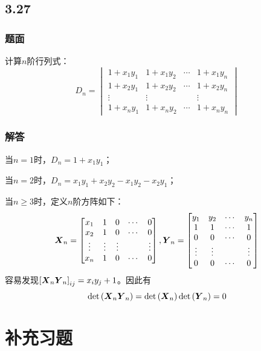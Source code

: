 \documentclass[10pt,xcolor=svgnames]{beamer} %
\begin{document}
\subsection*{3.27}
\begin{frame}
    \frametitle{题面}
    计算\(n\)阶行列式：
    \begin{equation*}
        D_n=
        \begin{vmatrix}
            1+x_{1}y_{1} & 1+x_{1}y_{2} & \cdots & 1+x_{1}y_{n} \\
            1+x_{2}y_{1} & 1+x_{2}y_{2} & \cdots & 1+x_{2}y_{n} \\
            \vdots       & \vdots       &        & \vdots       \\
            1+x_{n}y_{1} & 1+x_{n}y_{2} & \cdots & 1+x_{n}y_{n}
        \end{vmatrix}
    \end{equation*}
\end{frame}
\begin{frame}
    \frametitle{解答}
    当\(n=1\)时，\(D_n=1+x_1y_1\)；

    当\(n=2\)时，\(D_n=x_1y_1+x_2y_2-x_1y_2-x_2y_1\)；
    \pause

    当\(n\geq3\)时，定义\(n\)阶方阵如下：
    \begin{equation*}
        \boldsymbol{X}_n=
        \begin{bmatrix}
            x_{1}  & 1      & 0      & \cdots & 0      \\
            x_{2}  & 1      & 0      & \cdots & 0      \\
            \vdots & \vdots & \vdots &        & \vdots \\
            x_{n}  & 1      & 0      & \cdots & 0
        \end{bmatrix},
        \boldsymbol{Y}_n=
        \begin{bmatrix}
            y_{1}  & y_{2}  & \cdots & y_{n}  \\
            1      & 1      & \cdots & 1      \\
            0      & 0      & \cdots & 0      \\
            \vdots & \vdots &        & \vdots \\
            0      & 0      & \cdots & 0
        \end{bmatrix}
    \end{equation*}
    容易发现\(\left[ \boldsymbol{X}_n\boldsymbol{Y}_n \right]_{ij}=x_iy_j+1\)。因此有
    \begin{equation*}
        \mathrm{det}\left( \boldsymbol{X}_n\boldsymbol{Y}_n \right)=\mathrm{det}\left( \boldsymbol{X}_n \right)\mathrm{det}\left( \boldsymbol{Y}_n \right)=0
    \end{equation*}
\end{frame}

\section{补充习题}
\end{document}
